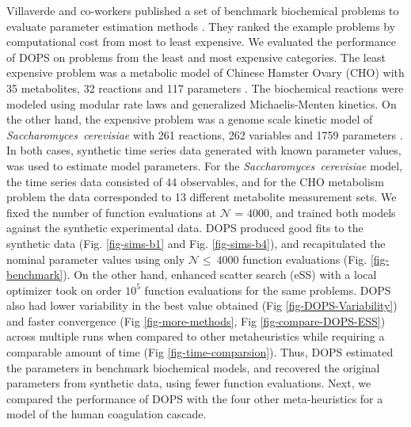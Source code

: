 \documentclass{bmcart}
\begin{document}
Villaverde and co-workers published a set of benchmark biochemical problems to evaluate parameter estimation methods \cite{villaverde2015biopredyn}.
They ranked the example problems by computational cost from most to least expensive.
We evaluated the performance of DOPS on problems from the least and most expensive categories.
The least expensive problem was a metabolic model of Chinese Hamster Ovary (CHO) with 35 metabolites, 32 reactions and 117 parameters \cite{villaverde2014high}.
The biochemical reactions were modeled using modular rate laws and generalized Michaelis-Menten kinetics.
On the other hand, the expensive problem was a genome scale kinetic model of \textit{Saccharomyces~cerevisiae} with 261 reactions, 262 variables and 1759 parameters \cite{smallbone2013large}.
In both cases, synthetic time series data generated with known parameter values, was used to estimate model parameters.
For the \textit{Saccharomyces~cerevisiae} model, the time series data consisted of 44 observables, and for the CHO metabolism problem the data corresponded to 13 different metabolite measurement sets.
We fixed the number of function evaluations at $\mathcal{N}$ = 4000, and trained both models against the synthetic experimental data.
DOPS produced good fits to the synthetic data (Fig. \ref{fig-sims-b1} and Fig. \ref{fig-sims-b4}), and recapitulated the nominal parameter values using only $\mathcal{N}\leq~4000$ function evaluations (Fig. \ref{fig-benchmark}).
On the other hand, enhanced scatter search (eSS) with a local optimizer took on order $10^{5}$ function evaluations for the same problems. DOPS also had lower variability in the best value obtained (Fig \ref{fig-DOPS-Variability}) and faster convergence (Fig \ref{fig-more-methods}, Fig \ref{fig-compare-DOPS-ESS}) across multiple runs when compared to other metaheuristics while requiring a comparable amount of time (Fig \ref{fig-time-comparsion}).
Thus, DOPS estimated the parameters in benchmark biochemical models, and recovered the original parameters from synthetic data, using fewer function evaluations.
Next, we compared the performance of DOPS with the four other meta-heuristics for a model of the human coagulation cascade.

\end{document}
